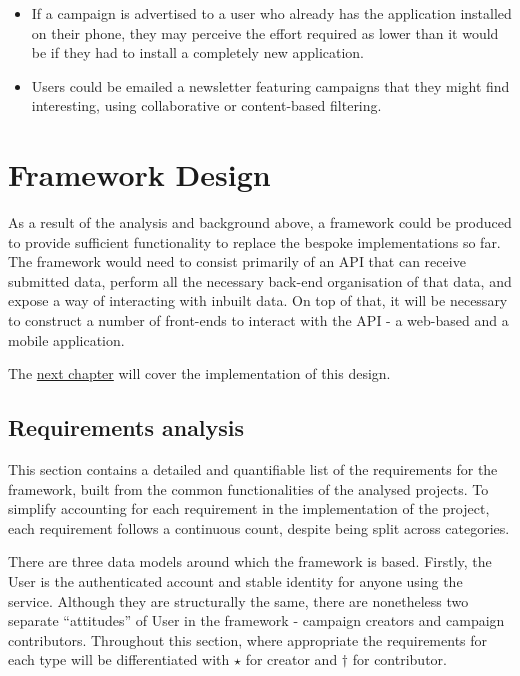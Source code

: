 \documentclass{article}
\let\oldsection\section
\renewcommand\section{\clearpage\oldsection}
\begin{document}
\begin{enumerate}
\begin{itemize}
				\item If a campaign is advertised to a user who already has the application installed on their phone, they may perceive the effort required as lower than it would be if they had to install a completely new application.
				\item Users could be emailed a newsletter featuring campaigns that they might find interesting, using collaborative or content-based filtering.
			\end{itemize}
		\end{enumerate}

	\section{Framework Design}
	\label{sec:architecture}
		As a result of the analysis and background above, a framework could be produced to provide sufficient functionality to replace the bespoke implementations so far. The framework would need to consist primarily of an API that can receive submitted data, perform all the necessary back-end organisation of that data, and expose a way of interacting with inbuilt data. On top of that, it will be necessary to construct a number of front-ends to interact with the API - a web-based and a mobile application.

		The \hyperref[sec:implementation]{next chapter} will cover the implementation of this design.

		\subsection{Requirements analysis}

		This section contains a detailed and quantifiable list of the requirements for the framework, built from the common functionalities of the analysed projects. To simplify accounting for each requirement in the implementation of the project, each requirement follows a continuous count, despite being split across categories.

		There are three data models around which the framework is based. Firstly, the User is the authenticated account and stable identity for anyone using the service. Although they are structurally the same, there are nonetheless two separate ``attitudes'' of User in the framework - campaign creators and campaign contributors. Throughout this section, where appropriate the requirements for each type will be differentiated with $\star$ for creator and $\dagger$ for contributor.
\end{document}

